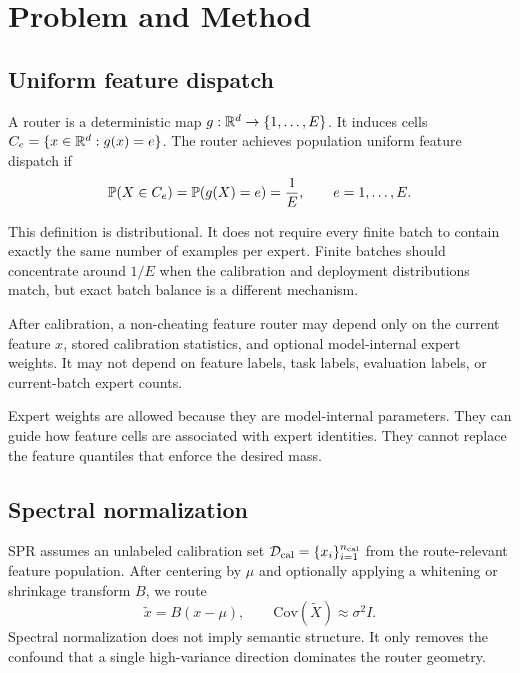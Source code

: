 \section{Problem and Method}

\subsection{Uniform feature dispatch}

\begin{definition}
A router is a deterministic map $g:\mathbb{R}^d\to\{1,\ldots,E\}$.  It induces cells
$C_e=\{x\in\mathbb{R}^d:g(x)=e\}$.  The router achieves population uniform feature
dispatch if
\begin{equation}
  \mathbb{P}(X\in C_e)=\mathbb{P}(g(X)=e)=\frac{1}{E},
  \qquad e=1,\ldots,E .
\end{equation}
\end{definition}

This definition is distributional.  It does not require every finite batch to
contain exactly the same number of examples per expert.  Finite batches should
concentrate around $1/E$ when the calibration and deployment distributions
match, but exact batch balance is a different mechanism.

\begin{definition}
After calibration, a non-cheating feature router may depend only on the current
feature $x$, stored calibration statistics, and optional model-internal expert
weights.  It may not depend on feature labels, task labels, evaluation labels,
or current-batch expert counts.
\end{definition}

Expert weights are allowed because they are model-internal parameters.  They can
guide how feature cells are associated with expert identities.  They cannot
replace the feature quantiles that enforce the desired mass.

\subsection{Spectral normalization}

SPR assumes an unlabeled calibration set
$\mathcal{D}_{\mathrm{cal}}=\{x_i\}_{i=1}^{n_{\mathrm{cal}}}$ from the route-relevant
feature population.  After centering by $\mu$ and optionally applying a
whitening or shrinkage transform $B$, we route
\begin{equation}
  \tilde x = B(x-\mu), \qquad
  \mathrm{Cov}(\tilde X)\approx \sigma^2 I .
\end{equation}
Spectral normalization does not imply semantic structure.  It only removes the
confound that a single high-variance direction dominates the router geometry.

